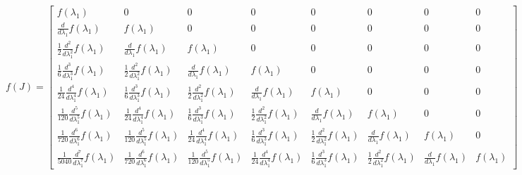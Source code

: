 \begin{displaymath}
f{\left (J \right )} = \left[\begin{matrix}f{\left (\lambda_{1} \right )} & 0 & 0 & 0 & 0 & 0 & 0 & 0\\\frac{d}{d \lambda_{1}} f{\left (\lambda_{1} \right )} & f{\left (\lambda_{1} \right )} & 0 & 0 & 0 & 0 & 0 & 0\\\frac{1}{2} \frac{d^{2}}{d \lambda_{1}^{2}}  f{\left (\lambda_{1} \right )} & \frac{d}{d \lambda_{1}} f{\left (\lambda_{1} \right )} & f{\left (\lambda_{1} \right )} & 0 & 0 & 0 & 0 & 0\\\frac{1}{6} \frac{d^{3}}{d \lambda_{1}^{3}}  f{\left (\lambda_{1} \right )} & \frac{1}{2} \frac{d^{2}}{d \lambda_{1}^{2}}  f{\left (\lambda_{1} \right )} & \frac{d}{d \lambda_{1}} f{\left (\lambda_{1} \right )} & f{\left (\lambda_{1} \right )} & 0 & 0 & 0 & 0\\\frac{1}{24} \frac{d^{4}}{d \lambda_{1}^{4}}  f{\left (\lambda_{1} \right )} & \frac{1}{6} \frac{d^{3}}{d \lambda_{1}^{3}}  f{\left (\lambda_{1} \right )} & \frac{1}{2} \frac{d^{2}}{d \lambda_{1}^{2}}  f{\left (\lambda_{1} \right )} & \frac{d}{d \lambda_{1}} f{\left (\lambda_{1} \right )} & f{\left (\lambda_{1} \right )} & 0 & 0 & 0\\\frac{1}{120} \frac{d^{5}}{d \lambda_{1}^{5}}  f{\left (\lambda_{1} \right )} & \frac{1}{24} \frac{d^{4}}{d \lambda_{1}^{4}}  f{\left (\lambda_{1} \right )} & \frac{1}{6} \frac{d^{3}}{d \lambda_{1}^{3}}  f{\left (\lambda_{1} \right )} & \frac{1}{2} \frac{d^{2}}{d \lambda_{1}^{2}}  f{\left (\lambda_{1} \right )} & \frac{d}{d \lambda_{1}} f{\left (\lambda_{1} \right )} & f{\left (\lambda_{1} \right )} & 0 & 0\\\frac{1}{720} \frac{d^{6}}{d \lambda_{1}^{6}}  f{\left (\lambda_{1} \right )} & \frac{1}{120} \frac{d^{5}}{d \lambda_{1}^{5}}  f{\left (\lambda_{1} \right )} & \frac{1}{24} \frac{d^{4}}{d \lambda_{1}^{4}}  f{\left (\lambda_{1} \right )} & \frac{1}{6} \frac{d^{3}}{d \lambda_{1}^{3}}  f{\left (\lambda_{1} \right )} & \frac{1}{2} \frac{d^{2}}{d \lambda_{1}^{2}}  f{\left (\lambda_{1} \right )} & \frac{d}{d \lambda_{1}} f{\left (\lambda_{1} \right )} & f{\left (\lambda_{1} \right )} & 0\\\frac{1}{5040} \frac{d^{7}}{d \lambda_{1}^{7}}  f{\left (\lambda_{1} \right )} & \frac{1}{720} \frac{d^{6}}{d \lambda_{1}^{6}}  f{\left (\lambda_{1} \right )} & \frac{1}{120} \frac{d^{5}}{d \lambda_{1}^{5}}  f{\left (\lambda_{1} \right )} & \frac{1}{24} \frac{d^{4}}{d \lambda_{1}^{4}}  f{\left (\lambda_{1} \right )} & \frac{1}{6} \frac{d^{3}}{d \lambda_{1}^{3}}  f{\left (\lambda_{1} \right )} & \frac{1}{2} \frac{d^{2}}{d \lambda_{1}^{2}}  f{\left (\lambda_{1} \right )} & \frac{d}{d \lambda_{1}} f{\left (\lambda_{1} \right )} & f{\left (\lambda_{1} \right )}\end{matrix}\right]
\end{displaymath}
